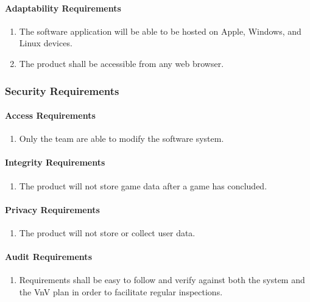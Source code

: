 \documentclass[12pt]{article}
\begin{document}
{\paragraph{Adaptability Requirements}
\begin{enumerate}[{MS}1., leftmargin=2\parindent, resume]
    \item The software application will be able to be hosted on Apple, Windows, and Linux devices.
    \item The product shall be accessible from any web browser.
\end{enumerate}



\subsubsection{Security Requirements}
\label{NFR_SR}
\paragraph{Access Requirements}
\begin{enumerate}[{SR}1., leftmargin=2\parindent]
    \item Only the \progname{} team are able to modify the software system.
\end{enumerate}

\paragraph{Integrity Requirements}
\begin{enumerate}[{SR}1., leftmargin=2\parindent, resume]
    \item The product will not store game data after a game has concluded.
\end{enumerate}

\paragraph{Privacy Requirements}
\begin{enumerate}[{SR}1., leftmargin=2\parindent, resume]
    \item The product will not store or collect user data.
\end{enumerate}

\paragraph{Audit Requirements}
\begin{enumerate}[{SR}1., leftmargin=2\parindent, resume]
    \item Requirements shall be easy to follow and verify against both the system and the VnV plan in order to facilitate regular inspections.
\end{enumerate}

}
\end{document}
